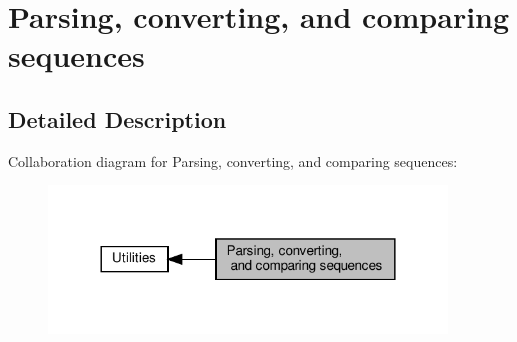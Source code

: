 \hypertarget{group__string__utils}{}\section{Parsing, converting, and comparing sequences}
\label{group__string__utils}


\subsection{Detailed Description}
Collaboration diagram for Parsing, converting, and comparing sequences\+:
\nopagebreak
\begin{figure}[H]
\begin{center}
\leavevmode
\includegraphics[width=300pt]{group__string__utils}
\end{center}
\end{figure}
